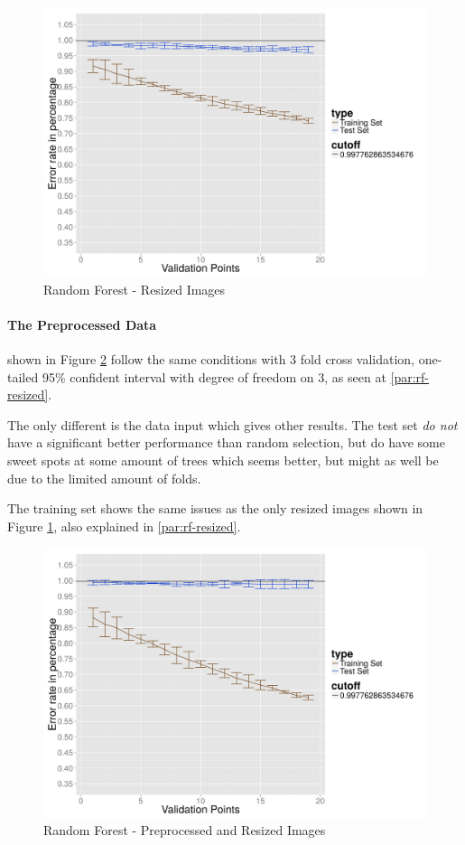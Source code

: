 \begin{figure}
  \centering
  \includegraphics[width=0.9\linewidth]{Images/DRFraw}
  \caption{Random Forest - Resized Images}
  \label{fig:rf-resized}
\end{figure}

\paragraph{The Preprocessed Data}
shown in Figure \ref{fig:rf-preprocessed} follow the same conditions with 3 fold cross validation, one-tailed 95\% confident interval with degree of freedom on 3, as seen at \ref{par:rf-resized}.

The only different is the data input which gives other results.
The test set \emph{do not} have a significant better performance than random selection, but do have some sweet spots at some amount of trees which seems better, but might as well be due to the limited amount of folds.

The training set shows the same issues as the only resized images shown in Figure \ref{fig:rf-resized}, also explained in \ref{par:rf-resized}.

\begin{figure}
  \centering
  \includegraphics[width=0.9\linewidth]{Images/DRFpreprocessed}
  \caption{Random Forest - Preprocessed and Resized Images}
  \label{fig:rf-preprocessed}
\end{figure}

